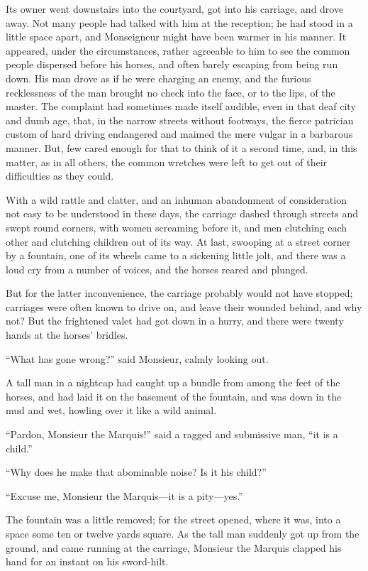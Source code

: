 Its owner went downstairs into the courtyard, got into his carriage,
and drove away.  Not many people had talked with him at the reception;
he had stood in a little space apart, and Monseigneur might have been
warmer in his manner.  It appeared, under the circumstances, rather
agreeable to him to see the common people dispersed before his horses,
and often barely escaping from being run down.  His man drove as if
he were charging an enemy, and the furious recklessness of the man
brought no check into the face, or to the lips, of the master.  The
complaint had sometimes made itself audible, even in that deaf city
and dumb age, that, in the narrow streets without footways, the fierce
patrician custom of hard driving endangered and maimed the mere vulgar
in a barbarous manner.  But, few cared enough for that to think of it
a second time, and, in this matter, as in all others, the common
wretches were left to get out of their difficulties as they could.

With a wild rattle and clatter, and an inhuman abandonment of
consideration not easy to be understood in these days, the carriage
dashed through streets and swept round corners, with women screaming
before it, and men clutching each other and clutching children out of
its way.  At last, swooping at a street corner by a fountain, one of
its wheels came to a sickening little jolt, and there was a loud cry
from a number of voices, and the horses reared and plunged.

But for the latter inconvenience, the carriage probably would not
have stopped; carriages were often known to drive on, and leave their
wounded behind, and why not?  But the frightened valet had got down in
a hurry, and there were twenty hands at the horses' bridles.

``What has gone wrong?'' said Monsieur, calmly looking out.

A tall man in a nightcap had caught up a bundle from among the feet
of the horses, and had laid it on the basement of the fountain,
and was down in the mud and wet, howling over it like a wild animal.

``Pardon, Monsieur the Marquis!'' said a ragged and submissive man,
``it is a child.''

``Why does he make that abominable noise?  Is it his child?''

``Excuse me, Monsieur the Marquis---it is a pity---yes.''

The fountain was a little removed; for the street opened, where it
was, into a space some ten or twelve yards square.  As the tall man
suddenly got up from the ground, and came running at the carriage,
Monsieur the Marquis clapped his hand for an instant on his sword-hilt.

